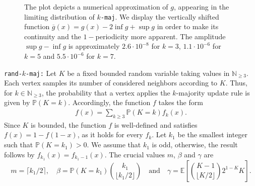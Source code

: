 \documentclass[11pt]{article}
\newcommand{\Prob}{\mathbb{P}}
\numberwithin{theorem}{section}
\begin{document}
\begin{figure}
    \centering
{}
\caption{The plot depicts a numerical approximation of $g$, appearing in the limiting distribution of \texttt{$k$-maj}.
We display the vertically shifted function $\overline{g}(x)=g(x)-2\inf g +\sup g$ in order to make its continuity and the $1-$periodicity more apparent. The amplitude $\sup g-\inf g$ is approximately $2.6\cdot 10^{-8}$ for $k=3$, $1.1\cdot 10^{-6}$ for $k=5$ and $5.5\cdot 10^{-6}$ for $k=7$.}
\label{fig:g3-maj}
\end{figure}


\medskip
\noindent
\texttt{rand-$k$-maj:} Let $K$ be a fixed bounded random variable taking values in $\mathbb{N}_{\geq 3}$. Each vertex samples its number of considered neighbors according to $K$. Thus, for $k\in \mathbb{N}_{\geq 3}$, the probability that a vertex applies the $k$-majority update rule is given by $\Prob(K=k)$. Accordingly, the function $f$ takes the form
\begin{align}\label{ex: f for random-k-maj}
    f(x) = \sum_{k\geq 3} \Prob(K=k)f_k(x).
\end{align}
Since $K$ is bounded, the function $f$ is well-defined and satisfies $f(x)=1-f(1-x)$, as it holds for every $f_k$.
Let $k_1$ be the smallest integer such that $\Prob(K=k_1)>0$. We assume that $k_1$ is odd, otherwise, the result follows by $f_{k_1}(x) = f_{k_1-1}(x)$. The crucial values $m$, $\beta$ and $\gamma$ are  
\[
m = \lceil k_1/2\rceil, \quad \beta = \Prob(K=k_1) \binom{k_1}{\lfloor k_1/2 \rfloor} \quad \text{and} \quad
\gamma = \mathbb{E}\left[\binom{K-1}{\lfloor K/2\rfloor} 2^{1-K}K\right].
\]
\end{document}
